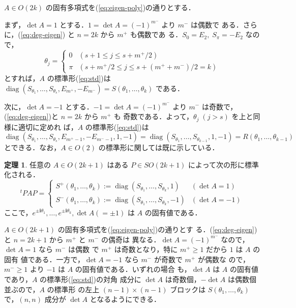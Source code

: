 \documentclass[11pt, uplatex, dvipdfmx, titlepage]{jsarticle}
\makeatletter
\renewcommand{\i}{\mathbf{i}}
\DeclareMathOperator{\diag}{diag}
\renewenvironment{proof}[1][\proofname]{\par
  \pushQED{\qed}%
  \normalfont \topsep6\p@\@plus6\p@\relax
  \trivlist
  \item[\hskip\labelsep
         \bfseries
    {#1}]\ignorespaces
}{%
  \popQED\endtrivlist\@endpefalse
}
\theoremstyle{definition}
\newtheorem{theorem}{定理}[section]
\renewcommand{\proofname}{\textbf{証明}}
\makeatother
\begin{document}
\begin{proof}
  $A \in O(2k)$ の固有多項式を(\ref{eq:eigen-poly})の通りとする．

  まず，$\det A =1$ とする．$1=\det A=(-1)^{m^-}$ より $m^{-}$ は偶数で
  ある．さらに，(\ref{eq:deg-eigen}) と $n=2k$ から $m^{+}$ も偶数であ
  る．$S_{0}=E_2, \; S_{\pi} = -E_2$ なので，
  \[
    \theta_j = \left\{
      \begin{array}{cl}
        0 & \left(s+1 \leq j \leq s+m^{+}/2\right)\\
        \pi & \left( s+m^{+}/2 \leq j \leq s+ (m^{+}+m^{-})/2 =k\right)
      \end{array}
    \right.
  \]
  とすれば，$A$ の標準形(\ref{eq:std})は
  $\diag(S_{\theta_1}, \ldots, S_{\theta_s}, E_{m^{+}}, -E_{m^{-}})=
  S(\theta_1, \ldots, \theta_k)$ である．

  次に，$\det A=-1$ とする．$-1=\det A = (-1)^{m^-}$
  より $m^{-}$ は奇数で，(\ref{eq:deg-eigen})と $n=2k$ から $m^{+}$ も
  奇数である．よって，$\theta_j \; (j > s)$ を上と同様に適切に定めれ
  ば，$A$ の標準形(\ref{eq:std})は
  \[
    \diag(S_{\theta_1}, \ldots, S_{\theta_s}, E_{m^{+}-1},
    -E_{m^{-}-1}, 1, -1) = \diag( S_{\theta_1}, \ldots, S_{\theta_{k-1}}, 1, -1) = R(\theta_1, \ldots, \theta_{k-1})
  \]
  とできる．なお，$A \in O(2)$ の標準形に関しては既に示している．
\end{proof}


\begin{theorem}\label{thm:stdodd}
  任意の $A \in O(2k+1)$ はある $P \in SO(2k+1)$ によって次の形に標準化される．
  \[
    {}^{t}PAP = \left\{
      \begin{array}{ll}
        S^{+}(\theta_1, \ldots, \theta_k) := \diag \left(S_{\theta_1}, \ldots, S_{\theta_k}, 1\right)
        & (\det A=1)\\
        S^{-}(\theta_1, \ldots, \theta_k) := \diag \left(S_{\theta_1}, \ldots, S_{\theta_k}, -1\right)
        & (\det A=-1)
      \end{array}
    \right.
  \]
  ここで，$e^{\pm \i \theta_1}, \ldots, e^{\pm \i \theta_k}, \det A (=\pm 1)$ は $A$ の固有値である．
\end{theorem}

\begin{proof}
  $A \in O(2k+1)$ の固有多項式を(\ref{eq:eigen-poly})の通りとす
  る．(\ref{eq:deg-eigen}) と $n=2k+1$ から $m^{+}$ と $m^{-}$ の偶奇は
  異なる．$\det A=(-1)^{m^-}$ なので，$\det A=1$ なら $m^{-}$ は偶数
  で $m^{+}$ は奇数となり，特に $m^{+} \geq 1$ だから $1$ は $A$ の固有
  値である．一方で，$\det A=-1$ なら $m^{-}$ が奇数で $m^{+}$ が偶数な
  ので，$m^{-} \geq 1$ より $-1$ は $A$ の固有値である．いずれの場合
  も，$\det A$ は $A$ の固有値であり，$A$ の標準形(\ref{eq:std})の対角
  成分に $\det A$ は奇数個，$-\det A$ は偶数個並ぶので，$A$ の標準形
  の左上 $(n-1) \times (n-1)$ ブロックは $S(\theta_1, \ldots,
    \theta_k)$ で，$(n,n)$ 成分が $\det A$ となるようにできる．
\end{proof}
\end{document}
